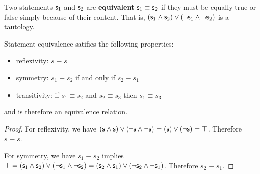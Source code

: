 \documentclass[11pt,letterpaper,fleqn]{memoir} %
\begin{document}
\begin{mathSection}

\begin{defn}
	Two statements $\mathsf{s}_1$ and $\mathsf{s}_2$ are \textbf{equivalent} $\mathsf{s}_1 \equiv \mathsf{s}_2$ if they must be equally true or false simply because of their content. That is, $(\mathsf{s}_1 \wedge \mathsf{s}_2) \vee (\neg\mathsf{s}_1 \wedge \neg\mathsf{s}_2)$ is a tautology.
\end{defn}

\begin{prop}
	Statement equivalence satifies the following properties:
	\begin{itemize}
		\item reflexivity: $s \equiv s$
		\item symmetry: $s_1 \equiv s_2$ if and only if $s_2 \equiv s_1$
		\item transitivity: if $s_1 \equiv s_2$ and $s_2 \equiv s_3$ then $s_1 \equiv s_3$
	\end{itemize}
	and is therefore an equivalence relation.
\end{prop}
\begin{proof}
	For reflexivity, we have $(\mathsf{s} \wedge \mathsf{s}) \vee (\neg\mathsf{s} \wedge \neg\mathsf{s}) = (\mathsf{s}) \vee (\neg\mathsf{s}) = \top$. Therefore $s \equiv s$.
	
	For symmetry, we have $s_1 \equiv s_2$ implies $\top = (\mathsf{s}_1 \wedge \mathsf{s}_2) \vee (\neg\mathsf{s}_1 \wedge \neg\mathsf{s}_2) = (\mathsf{s}_2 \wedge \mathsf{s}_1) \vee (\neg\mathsf{s}_2 \wedge \neg\mathsf{s}_1)$. Therefore $s_2 \equiv s_1$.
	

\end{proof}
\end{mathSection}
\end{document}
